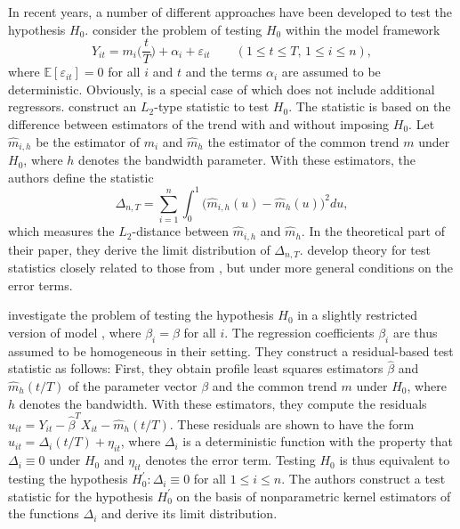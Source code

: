 \documentclass[a4paper,12pt]{article}
\makeatletter
\renewcommand{\eqref}[1]{\tagform@{\ref{#1}}}
\makeatother
\begin{document}
In recent years, a number of different approaches have been developed to test the hypothesis $H_0$. \cite{DegrasWu2012} consider the problem of testing $H_0$ within the model framework
\begin{equation}\label{model-degras}
Y_{it} = m_i \Big( \frac{t}{T} \Big) + \alpha_i + \varepsilon_{it} \qquad (1 \le t \le T, \, 1 \le i \le n), 
\end{equation}
where $\mathbb{E}[\varepsilon_{it}] = 0$ for all $i$ and $t$ and the terms $\alpha_i$ are assumed to be deterministic. Obviously, \eqref{model-degras} is a special case of \eqref{model} which does not include additional regressors. \cite{DegrasWu2012} construct an $L_2$-type statistic to test $H_0$. The statistic is based on the difference between estimators of the trend with and without imposing $H_0$. Let $\hat{m}_{i,h}$ be the estimator of $m_i$ and $\hat{m}_h$ the estimator of the common trend $m$ under $H_0$, where $h$ denotes the bandwidth parameter. With these estimators, the authors define the statistic
\begin{equation}\label{stat-degras}
\Delta_{n,T} = \sum_{i=1}^n \int_0^1 \big(\hat{m}_{i,h}(u) - \hat{m}_h(u)\big)^2 du, 
\end{equation} 
which measures the $L_2$-distance between $\hat{m}_{i, h}$ and $\hat{m}_h$. In the theoretical part of their paper, they derive the limit distribution of $\Delta_{n,T}$. \cite{ChenWu2018} develop theory for test statistics closely related to those from \cite{DegrasWu2012}, but under more general conditions on the error terms. 


\cite{Zhang2012} investigate the problem of testing the hypothesis $H_0$ in a slightly restricted version of model \eqref{model}, where $\beta_i = \beta$ for all $i$. The regression coefficients $\beta_i$ are thus assumed to be homogeneous in their setting. They construct a residual-based test statistic as follows: First, they obtain profile least squares estimators $\hat{\beta}$ and $\hat{m}_h(t/T)$ of the parameter vector $\beta$ and the common trend $m$ under $H_0$, where $h$ denotes the bandwidth. With these estimators, they compute the residuals $\hat{u}_{it} = Y_{it} - \hat{\beta}^T X_{it} - \hat{m}_h(t/T)$. These residuals are shown to have the form $\hat{u}_{it} = \Delta_i(t/T) + \eta_{it}$, where $\Delta_i$ is a deterministic function with the property that $\Delta_i \equiv 0$ under $H_0$ and $\eta_{it}$ denotes the error term. Testing $H_0$ is thus equivalent to testing the hypothesis $H_0^\prime: \Delta_i \equiv 0$ for all $1 \le i \le n$. The authors construct a test statistic for the hypothesis $H_0^\prime$ on the basis of nonparametric kernel estimators of the functions $\Delta_i$ and derive its limit distribution.  
\end{document}
